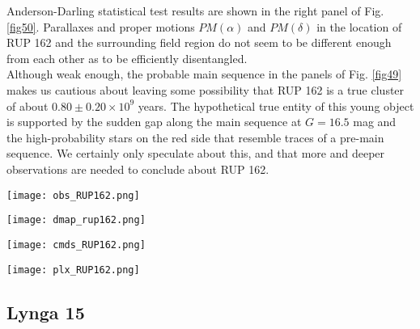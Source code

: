 \documentclass[draft]{aa}
\begin{document}
Anderson-Darling statistical test results are shown in the right panel of Fig. \ref{fig50}. Parallaxes and proper motions $PM(\alpha)$ and $PM(\delta)$ in the
location of RUP 162 and the surrounding field region do not seem to be
different enough from each other as to be efficiently disentangled.\\

Although weak enough, the probable main sequence in the 
panels of Fig. \ref{fig49} makes us cautious about leaving some possibility that RUP 162 is a true cluster of about $0.80\pm0.20\times10^9$ years.
The hypothetical true entity of this young
object is supported by the sudden gap along the main sequence at $G=16.5$ mag
and the high-probability stars on the red side that resemble traces of
a pre-main sequence. We certainly only speculate about this, and that
more and deeper observations are needed to conclude about
RUP 162.

\begin{figure*}[ht]
    \centering
    \texttt{[image: obs\_RUP162.png]}
    \caption{Idem Fig. \ref{fig:photom_vdBH85} for RUP 162.}
    \label{fig47}
\end{figure*}
\begin{figure*}[ht]
    \centering
    \texttt{[image: dmap\_rup162.png]}
    \caption{Idem Fig. \ref{fig:struct_vdBH85} for RUP 162.}
    \label{fig48}
\end{figure*}
\begin{figure*}[ht]
    \centering
    \texttt{[image: cmds\_RUP162.png]}
    \caption{Idem Fig. \ref{fig:fundpars_vdBH85} for RUP 162.}
    \label{fig49}
\end{figure*}
\begin{figure*}[ht]
    \centering
    \texttt{[image: plx\_RUP162.png]}
    \caption{Idem Fig. \ref{fig:plx_bys_vdBH85} for RUP 162.}
    \label{fig50}
\end{figure*}




\subsection{Lynga 15}
\end{document}

